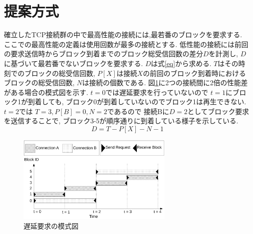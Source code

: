 \documentclass{ltjsarticle}
\begin{document}
\section{提案方式}
\vspace{-3mm}
確立したTCP接続群の中で最高性能の接続には,最若番のブロックを要求する.
ここでの最高性能の定義は使用回数が最多の接続とする.
低性能の接続には前回の要求送信時からブロック到着までのブロック総受信回数の差分\begin{math}D\end{math}を計測し,
\begin{math}D\end{math}に基づいて最若番でないブロックを要求する.
\begin{math}D\end{math}は式\ref{eq}から求める.
\begin{math}T\end{math}はその時刻でのブロックの総受信回数,
\begin{math}P[X]\end{math}は接続\begin{math}X\end{math}の前回のブロック到着時におけるブロックの総受信回数,
\begin{math}N\end{math}は接続の個数である.
図\ref{delay}に2つの接続間に2倍の性能差がある場合の模式図を示す.
\begin{math}t=0\end{math}では遅延要求を行っていないので
\begin{math}t=1\end{math}にブロック1が到着しても,
ブロック0が到着していないのでブロック1は再生できない.
\begin{math}t=2\end{math}では
\begin{math}T=3, P[B]=0, N=2\end{math}であるので
接続Bに\begin{math}D=2\end{math}としてブロック要求を送信することで,
ブロック3-5が順序通りに到着している様子を示している.
\vspace{-4.5mm}
\begin{equation}
	\label{eq}
	D = T - P[X] - N - 1
\end{equation}
\vspace{-11mm}
\begin{figure}[h]
	\centering
	\includegraphics[width=7.6cm]{figure/delay.pdf}
	\vspace{-5mm}
	\caption{遅延要求の模式図}
	\label{delay}
\end{figure}
\vspace{-13.75mm}
\end{document}
